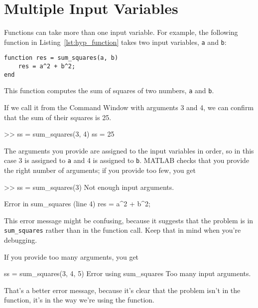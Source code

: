 \section{Multiple Input Variables}
\label{hypotenuse}


Functions can take more than one input variable.
For example, the following function in Listing~\ref{lst:hyp_function} takes two input variables,
\lstinline{a} and \lstinline{b}:

\begin{lstlisting}[caption={A function that computes the sum of squares of two numbers}, label={lst:hyp_function}]
function res = sum_squares(a, b)
    res = a^2 + b^2;
end
\end{lstlisting}

This function computes the sum of squares of two numbers, \lstinline{a}
and \lstinline{b}.

If we call it from the Command Window with arguments 3 and 4, we can
confirm that the sum of their squares is 25.

\begin{code}
>> ss = sum_squares(3, 4)
ss = 25
\end{code}

The arguments you provide are assigned to the input variables in
order, so in this case 3 is assigned to \lstinline{a} and 4 is assigned to
\lstinline{b}.  MATLAB checks that you provide the right number of arguments;
if you provide too few, you get

\begin{code}
>> ss = sum_squares(3)
Not enough input arguments.

Error in sum_squares (line 4)
    res = a^2 + b^2;
\end{code}

This error message might be confusing, because it suggests that
the problem is in \lstinline{sum_squares} rather than in the function call.
Keep that in mind when you're debugging.

If you provide too many arguments, you get

\begin{code}
ss = sum_squares(3, 4, 5)
Error using sum_squares
Too many input arguments.
\end{code}

That's a better error message, because it's clear that the problem isn't in the function, it's in the way we're using the function.

